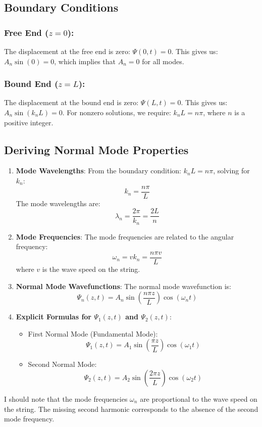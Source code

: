 \documentclass{article}
\begin{document}
\subsection*{Boundary Conditions}

\subsubsection*{Free End (\(z = 0\)):}
The displacement at the free end is zero: \(\Psi(0, t) = 0\). This gives us: \(A_n \sin(0) = 0\), which implies that \(A_n = 0\) for all modes.

\subsubsection*{Bound End (\(z = L\)):}
The displacement at the bound end is zero: \(\Psi(L, t) = 0\). This gives us: \(A_n \sin(k_n L) = 0\). For nonzero solutions, we require: \(k_n L = n\pi\), where \(n\) is a positive integer.

\subsection*{Deriving Normal Mode Properties}

\begin{enumerate}
    \item \textbf{Mode Wavelengths}:
    From the boundary condition: \(k_n L = n\pi\), solving for \(k_n\):
    \[ k_n = \frac{n\pi}{L} \]
    The mode wavelengths are:
    \[ \lambda_n = \frac{2\pi}{k_n} = \frac{2L}{n} \]

    \item \textbf{Mode Frequencies}:
    The mode frequencies are related to the angular frequency:
    \[ \omega_n = v k_n = \frac{n\pi v}{L} \]
    where \(v\) is the wave speed on the string.

    \item \textbf{Normal Mode Wavefunctions}:
    The normal mode wavefunction is:
    \[ \Psi_n(z, t) = A_n \sin\left(\frac{n\pi z}{L}\right) \cos(\omega_n t) \]

    \item \textbf{Explicit Formulas for \(\Psi_1(z, t)\) and \(\Psi_2(z, t)\)}:
    \begin{itemize}
        \item First Normal Mode (Fundamental Mode):
        \[ \Psi_1(z, t) = A_1 \sin\left(\frac{\pi z}{L}\right) \cos(\omega_1 t) \]

        \item Second Normal Mode:
        \[ \Psi_2(z, t) = A_2 \sin\left(\frac{2\pi z}{L}\right) \cos(\omega_2 t) \]
    \end{itemize}
\end{enumerate}

I should note that the mode frequencies \(\omega_n\) are proportional to the wave speed on the string. The missing second harmonic corresponds to the absence of the second mode frequency.
\end{document}
